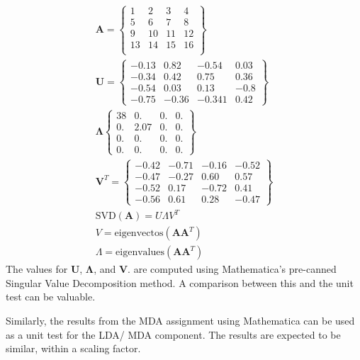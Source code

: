 \documentclass[11pt, twocolumn]{article}
\begin{document}
\begin{eqnarray}
\mathbf{A}= 
\left\{
\begin{array}{llll}
1	& 	2 	& 	3	& 	4 \\
5	&	6	& 	7	& 	8 \\
9	&	10	&	11	&	12 \\
13	&	14	&	15	&	16 \\
\end{array}
\right\} \\
\mathbf{U} = 
\left\{
\begin{array}{llll}
-0.13		& 0.82	& -0.54	& 0.03 \\
-0.34 	& 0.42	&  0.75	& 0.36	\\
-0.54		& 0.03	& 0.13	& -0.8	\\
-0.75		& -0.36	& -0.341	& 0.42
\end{array}
\right\} \\
\mathbf{\Lambda}
\left\{
\begin{array}{llll}
38	& 0. 		& 0. 	&  0.\\
0.		& 2.07	& 0.	& 0.\\
0.		& 0.		& 0.	& 0.\\
0.		& 0.		& 0.	& 0.
\end{array}
\right\} \\
\mathbf{V}^T =
\left\{
\begin{array}{llll}
-0.42		& -0.71	& -0.16	& -0.52	\\
-0.47		& -0.27	& 0.60	& 0.57	\\
-0.52		& 0.17	& -0.72	& 0.41	\\
-0.56		& 0.61	& 0.28	& -0.47
\end{array}
\right\} \\
\textrm{SVD} (\mathbf{A}) = U \Lambda V^T \\
V = \textrm{eigenvectos}(\mathbf{A}\mathbf{A}^T) \\
\Lambda = \textrm{eigenvalues}(\mathbf{A}\mathbf{A}^T) 
\end{eqnarray}
The values for $\mathbf{U}$, $\mathbf{\Lambda}$, and $\mathbf{V}$. are computed using Mathematica's pre-canned Singular Value Decomposition method.   A comparison between this and the unit test can be valuable. 

Similarly, the results from the MDA assignment using Mathematica can be used as a unit test for the LDA/ MDA component.  The results are expected to be similar, within a scaling factor.  
\end{document}
